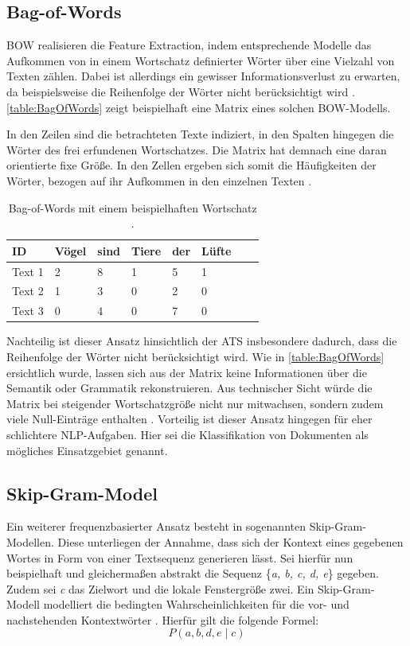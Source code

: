 \subsection{Bag-of-Words}
\noindent
\ac{BOW} realisieren die Feature Extraction, indem entsprechende Modelle das Aufkommen von in einem Wortschatz definierter Wörter über eine Vielzahl von Texten zählen. Dabei ist allerdings ein gewisser Informationsverlust zu erwarten, da beispielsweise die Reihenfolge der Wörter nicht berücksichtigt wird \cite[S.~262]{RAS19}. \autoref{table:BagOfWords} zeigt beispielhaft eine Matrix eines solchen \ac{BOW}-Modells.
\newpage

\noindent
In den Zeilen sind die betrachteten Texte indiziert, in den Spalten hingegen die Wörter des frei erfundenen Wortschatzes. Die Matrix hat demnach eine daran orientierte fixe Größe. In den Zellen ergeben sich somit die Häufigkeiten der Wörter, bezogen auf ihr Aufkommen in den einzelnen Texten \cite{BRO19}.

\begin{table}[htb]
\centering
\begin{tabular}{ | p{1.8cm} | p{1.8cm} | p{1.8cm} | p{1.8cm} | p{1.8cm} | p{1.8cm} | p{1.8cm} | p{1.8cm} | }
\hline
\textbf{ID} & \textbf{Vögel} & \textbf{sind} & \textbf{Tiere} & \textbf{der} & \textbf{Lüfte} \\
\hline
Text 1 & 2 & 8 & 1 & 5 & 1 \\
\hline
Text 2 & 1 & 3 & 0 & 2 & 0 \\
\hline
Text 3 & 0 & 4 & 0 & 7 & 0 \\
\hline
\end{tabular}
\caption{Bag-of-Words mit einem beispielhaften Wortschatz \cite{HUI20}.}
\label{table:BagOfWords}
\end{table}

\noindent
Nachteilig ist dieser Ansatz hinsichtlich der \ac{ATS} insbesondere dadurch, dass die Reihenfolge der Wörter nicht berücksichtigt wird. Wie in \autoref{table:BagOfWords} ersichtlich wurde, lassen sich aus der Matrix keine Informationen über die Semantik oder Grammatik rekonstruieren. Aus technischer Sicht würde die Matrix bei steigender Wortschatzgröße nicht nur mitwachsen, sondern zudem viele Null-Einträge enthalten \cite{HUI20}. Vorteilig ist dieser Ansatz hingegen für eher schlichtere \ac{NLP}-Aufgaben. Hier sei die Klassifikation von Dokumenten als mögliches Einsatzgebiet genannt.


\subsection{Skip-Gram-Model}
\noindent
Ein weiterer frequenzbasierter Ansatz besteht in sogenannten Skip-Gram-Modellen. Diese unterliegen der Annahme, dass sich der Kontext eines gegebenen Wortes in Form von einer Textsequenz generieren lässt. Sei hierfür nun beispielhaft und gleichermaßen abstrakt die Sequenz {\{\textit{a, b, c, d, e}\}} gegeben. Zudem sei \textit{c} das Zielwort und die lokale Fenstergröße zwei. Ein Skip-Gram-Modell modelliert die bedingten Wahrscheinlichkeiten für die vor- und nachstehenden Kontextwörter \cite[S.~640]{ZHA20}. Hierfür gilt die folgende Formel: $$P(a, b, d, e \mid c)$$

